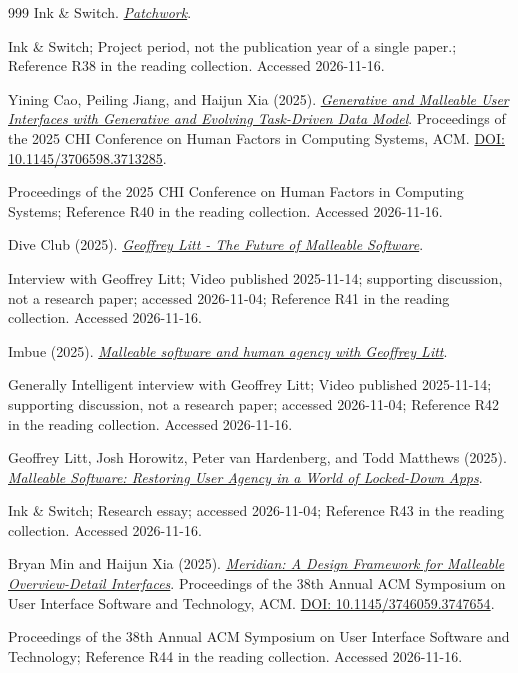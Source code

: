 \documentclass[11pt,letterpaper]{article}
\begin{document}
\begin{thebibliography}{999}
Ink \& Switch.
\href{https://www.inkandswitch.com/project/patchwork/}{\emph{Patchwork}}.
\par {\small Ink \& Switch; Project period, not the publication year of a single paper.; Reference R38 in the reading collection.}
{\small Accessed 2026-11-16.}

Yining Cao, Peiling Jiang, and Haijun Xia (2025).
\href{https://arxiv.org/abs/2503.04084}{\emph{Generative and Malleable User Interfaces with Generative and Evolving Task-Driven Data Model}}.
Proceedings of the 2025 CHI Conference on Human Factors in Computing Systems, ACM.
\href{https://doi.org/10.1145/3706598.3713285}{DOI: 10.1145/3706598.3713285}.
\par {\small Proceedings of the 2025 CHI Conference on Human Factors in Computing Systems; Reference R40 in the reading collection.}
{\small Accessed 2026-11-16.}

Dive Club (2025).
\href{https://www.youtube.com/watch?v=zJf0UeCwQqE}{\emph{Geoffrey Litt - The Future of Malleable Software}}.
\par {\small Interview with Geoffrey Litt; Video published 2025-11-14; supporting discussion, not a research paper; accessed 2026-11-04; Reference R41 in the reading collection.}
{\small Accessed 2026-11-16.}

Imbue (2025).
\href{https://www.youtube.com/watch?v=JBFafFHiDwk}{\emph{Malleable software and human agency with Geoffrey Litt}}.
\par {\small Generally Intelligent interview with Geoffrey Litt; Video published 2025-11-14; supporting discussion, not a research paper; accessed 2026-11-04; Reference R42 in the reading collection.}
{\small Accessed 2026-11-16.}

Geoffrey Litt, Josh Horowitz, Peter van Hardenberg, and Todd Matthews (2025).
\href{https://www.inkandswitch.com/essay/malleable-software/}{\emph{Malleable Software: Restoring User Agency in a World of Locked-Down Apps}}.
\par {\small Ink \& Switch; Research essay; accessed 2026-11-04; Reference R43 in the reading collection.}
{\small Accessed 2026-11-16.}

Bryan Min and Haijun Xia (2025).
\href{https://hci.ucsd.edu/papers/meridian.pdf}{\emph{Meridian: A Design Framework for Malleable Overview-Detail Interfaces}}.
Proceedings of the 38th Annual ACM Symposium on User Interface Software and Technology, ACM.
\href{https://doi.org/10.1145/3746059.3747654}{DOI: 10.1145/3746059.3747654}.
\par {\small Proceedings of the 38th Annual ACM Symposium on User Interface Software and Technology; Reference R44 in the reading collection.}
{\small Accessed 2026-11-16.}


\end{thebibliography}
\end{document}
